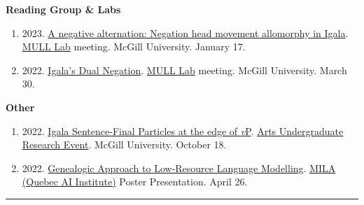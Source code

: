 \documentclass[margin,line]{resume}
\begin{document}
\begin{resume}
	\textbf{Reading Group \& Labs}
	\begin{enumerate}[-, leftmargin=1em, topsep=4pt]
		\item[] {2023. \href{https://mcling.blogs.mcgill.ca/2023/01/15/mull-lab-1-17-brandon-chaperon/}{A negative alternation: Negation head movement allomorphy in Igala}. \href{https://mull-lab.org/}{MULL Lab} meeting. McGill University. January 17.}

		\item[] {2022. \href{https://mcling.blogs.mcgill.ca/2022/03/27/mull-lab-03-30-brandon-chaperon/}{Igala's Dual Negation}. \href{https://mull-lab.org/}{MULL Lab} meeting. McGill University. March 30.}
	\end{enumerate}

	\textbf{Other}
	\begin{enumerate}[-, leftmargin=1em, topsep=4pt]
		\item[] {2022. \href{https://www.mcgill.ca/arts-internships/files/arts-internships/brandon_chaperon.pdf}{Igala Sentence-Final Particles at the edge of \textit{v}P}. \href{https://www.mcgill.ca/arts-internships/events-0/#block-bean-annual-faculty-of-arts-undergrad}{Arts Undergraduate Research Event}. McGill University. October 18.}

		\item[] {2022. \href{https://github.com/peterzee-tsien/LING484-COMP599-Final-Projects/blob/main/484_Research_Poster.pdf}{Genealogic Approach to Low-Resource Language Modelling}. \href{https://mila.quebec/en/}{MILA (Quebec AI Institute)} Poster Presentation. April 26.}

	\end{enumerate}


	\vspace{-0.6em}\rule{\textwidth}{0.4pt}


	\begin{comment}
	\section{\mysidestyle Teaching}

	\href{https://www.mcgill.ca/study/2023-2024/courses/ling-410}{LING 410 - Structure of Wolof} undergraduate class for \href{https://inamartinovic.com/}{Martina Martinović}.\\
	McGill University.
	\hfill Feb 28 2024

	\vspace{-0.6em}\rule{\textwidth}{0.4pt}
	\end{comment}


\end{resume}
\end{document}

